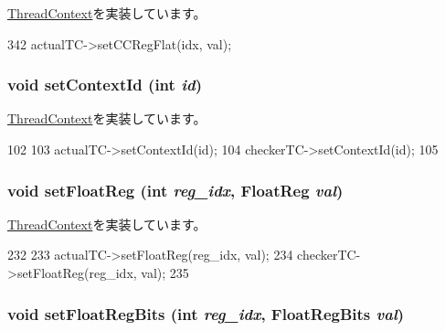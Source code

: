 \hyperlink{classThreadContext_ab1028831649236bd6f229a4561663fd9}{ThreadContext}を実装しています。


\begin{DoxyCode}
342     { actualTC->setCCRegFlat(idx, val); }
\end{DoxyCode}
\hypertarget{classCheckerThreadContext_a0dd10037a5b0eadaddfe7c67d52d3ac6}{
\subsubsection[{setContextId}]{\setlength{\rightskip}{0pt plus 5cm}void setContextId (int {\em id})}}
\label{classCheckerThreadContext_a0dd10037a5b0eadaddfe7c67d52d3ac6}


\hyperlink{classThreadContext_a60a9383e4a460807756f2de9f5215582}{ThreadContext}を実装しています。


\begin{DoxyCode}
102     {
103        actualTC->setContextId(id);
104        checkerTC->setContextId(id);
105     }
\end{DoxyCode}
\hypertarget{classCheckerThreadContext_ab6fd8e55b81c173f448ec0c42bc28b99}{
\subsubsection[{setFloatReg}]{\setlength{\rightskip}{0pt plus 5cm}void setFloatReg (int {\em reg\_\-idx}, \/  {\bf FloatReg} {\em val})}}
\label{classCheckerThreadContext_ab6fd8e55b81c173f448ec0c42bc28b99}


\hyperlink{classThreadContext_af8dc9762fda519d911372dd6f4a28d8e}{ThreadContext}を実装しています。


\begin{DoxyCode}
232     {
233         actualTC->setFloatReg(reg_idx, val);
234         checkerTC->setFloatReg(reg_idx, val);
235     }
\end{DoxyCode}
\hypertarget{classCheckerThreadContext_a618651078f08ecd328dfe3312f0f2ea7}{
\subsubsection[{setFloatRegBits}]{\setlength{\rightskip}{0pt plus 5cm}void setFloatRegBits (int {\em reg\_\-idx}, \/  {\bf FloatRegBits} {\em val})}}
\label{classCheckerThreadContext_a618651078f08ecd328dfe3312f0f2ea7}


